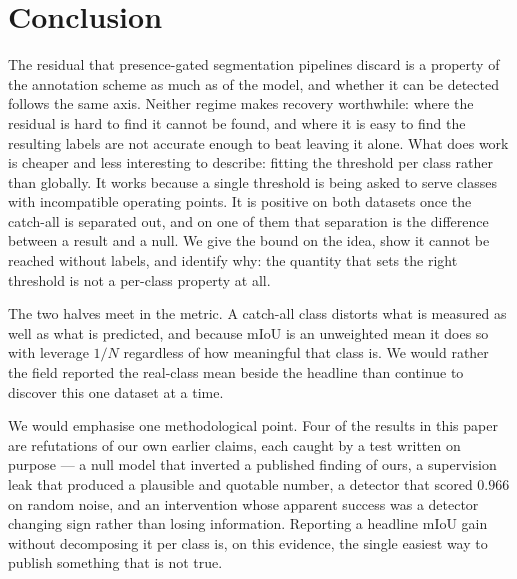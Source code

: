 \documentclass[10pt,a4paper]{article}                        %
\begin{document}
\section{Conclusion}
\label{sec:conclusion}

The residual that presence-gated segmentation pipelines discard is a property of
the annotation scheme as much as of the model, and whether it can be detected
follows the same axis. Neither regime makes recovery worthwhile: where the
residual is hard to find it cannot be found, and where it is easy to find the
resulting labels are not accurate enough to beat leaving it alone. What does work is cheaper and less interesting to describe: fitting the threshold
per class rather than globally. It works because a single threshold is being asked
to serve classes with incompatible operating points. It is positive on both datasets
once the catch-all is separated out, and on one of them that separation is the
difference between a result and a null. We give the bound on the idea, show it
cannot be reached without labels, and identify why: the quantity that sets the
right threshold is not a per-class property at all.

The two halves meet in the metric. A catch-all class distorts what is measured as
well as what is predicted, and because mIoU is an unweighted mean it does so with
leverage $1/N$ regardless of how meaningful that class is. We would rather the
field reported the real-class mean beside the headline than continue to discover
this one dataset at a time.

We would emphasise one methodological point. Four of the results in this paper
are refutations of our own earlier claims, each caught by a test written on
purpose --- a null model that inverted a published finding of ours, a supervision
leak that produced a plausible and quotable number, a detector that scored $0.966$
on random noise, and an intervention whose apparent success was a detector
changing sign rather than losing information. Reporting a headline mIoU gain without decomposing it
per class is, on this evidence, the single easiest way to publish something that
is not true.



\end{document}

